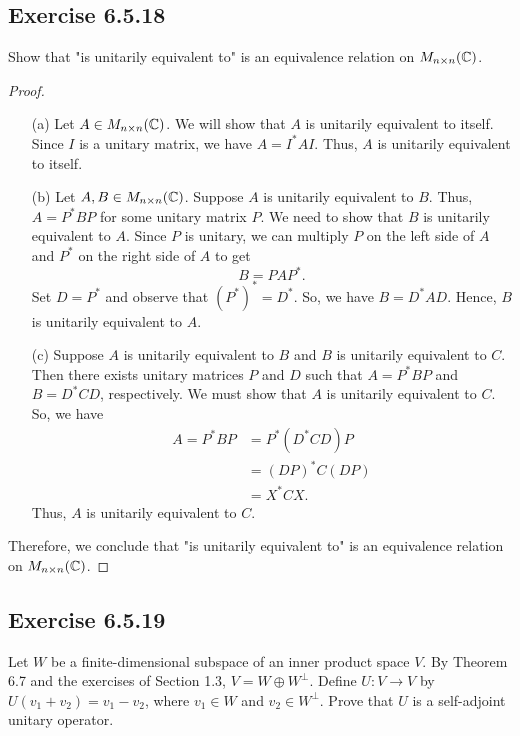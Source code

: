 \subsection*{Exercise 6.5.18} Show that "is unitarily equivalent to" is an equivalence relation on \( {M}_{n \times n}(\mathbb{C}) \). 

\begin{proof}
\begin{enumerate}
    \item[(a)] Let \( A  \in {M}_{n \times n }(\mathbb{C}) \). We will show that \( A  \) is unitarily equivalent to itself. Since \( I  \) is a unitary matrix, we have \( A = I^{*} A I  \). Thus, \( A  \) is unitarily equivalent to itself. 
    \item[(b)] Let \( A, B \in {M}_{n \times n }(\mathbb{C}) \). Suppose \( A  \) is unitarily equivalent to \( B  \). Thus, \( A = P^{*} B P  \) for some unitary matrix \( P  \). We need to show that \( B  \) is unitarily equivalent to \( A  \). Since \( P  \) is unitary, we can multiply \( P  \) on the left side of \( A  \) and \( P^{*}  \) on the right side of \( A  \) to get
        \[  B = P A P^{*}. \]
        Set \( D = P^{*} \) and observe that \( (P^{*})^{*} = D^{*} \). So, we have \( B = D^{*}A D  \). Hence, \( B  \) is unitarily equivalent to \(  A  \).
    \item[(c)] Suppose \( A  \) is unitarily equivalent to \( B  \) and \( B  \) is unitarily equivalent to \( C  \). Then there exists unitary matrices \( P  \) and \( D  \) such that \( A = P^{*} B P   \) and \( B = D^{*} C D  \), respectively. We must show that \( A  \) is unitarily equivalent to \( C  \). So, we have     
        \begin{align*}
            A = P^{*} B P &= P^{*} (D^{*} C D ) P  \\
                          &= (DP)^{*} C (DP) \\
                          &= X^{*} C X \tag{set \( X = DP \)}. 
        \end{align*}
        Thus, \( A  \) is unitarily equivalent to \( C  \).
\end{enumerate}
Therefore, we conclude that "is unitarily equivalent to" is an equivalence relation on \( {M}_{n \times n}(\mathbb{C}) \).
\end{proof}

\subsection*{Exercise 6.5.19} Let \( W  \) be a finite-dimensional subspace of an inner product space \( V  \). By Theorem 6.7 and the exercises of Section 1.3, \( V = W \oplus W^{\perp} \). Define \( U: V \to V  \) by \( U({v}_{1} + {v}_{2}) = {v}_{1} - {v}_{2} \), where \( {v}_{1} \in W  \) and \( {v}_{2} \in W^{\perp} \). Prove that \( U  \) is a self-adjoint unitary operator. 

